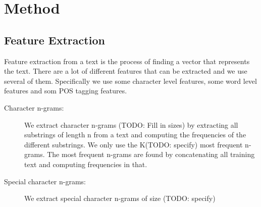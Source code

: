 \section{Method}

\subsection{Feature Extraction}
Feature extraction from a text is the process of finding a vector that
represents the text. There are a lot of different features that can be
extracted and we use several of them. Specifically we use some character
level features, some word level features and som \gls{POS} tagging
features.

\begin{description}

    \item[Character n-grams:] We extract character n-grams (TODO: Fill in sizes)
    by extracting all substrings of length n from a text and computing the
    frequencies of the different substrings. We only use the K(TODO: specify)
    most frequent n-grams. The most frequent n-grams are found by concatenating
    all training text and computing frequencies in that.

    \item[Special character n-grams:] We extract special character n-grams of size
    (TODO: specify)

\end{description}





